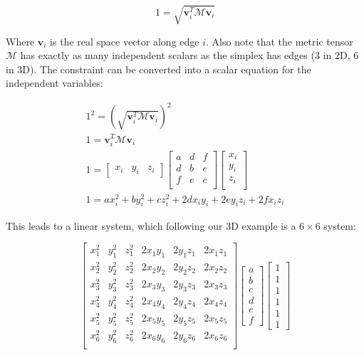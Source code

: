 \begin{equation}
1 = \sqrt{\mathbf{v}_i^T \mathcal{M} \mathbf{v}_i}
\end{equation}

Where $\mathbf{v}_i$ is the real space vector along edge $i$.
Also note that the metric tensor $\mathcal{M}$ has exactly as
many independent scalars as the simplex has edges
($3$ in 2D, $6$ in 3D).
The constraint can be converted into a scalar equation
for the independent variables:

\begin{gather*}
1^2 = \left(\sqrt{\mathbf{v}_i^T \mathcal{M} \mathbf{v}_i}\right)^2 \\
1 = \mathbf{v}_i^T \mathcal{M} \mathbf{v}_i \\
1 = \begin{bmatrix} x_i & y_i & z_i \end{bmatrix}
\begin{bmatrix}
a & d & f \\
d & b & e \\
f & e & c \\
\end{bmatrix}
\begin{bmatrix}
x_i \\
y_i \\
z_i \\
\end{bmatrix} \\
1 = ax_i^2 + by_i^2 + cz_i^2 + 2dx_iy_i + 2ey_iz_i + 2fx_iz_i
\end{gather*}

This leads to a linear system, which following our 3D example
is a $6\times 6$ system:

\begin{equation}
\begin{bmatrix}
x_1^2 & y_1^2 & z_1^2 & 2x_1y_1 & 2y_1z_1 & 2x_1z_1 \\
x_2^2 & y_2^2 & z_2^2 & 2x_2y_2 & 2y_2z_2 & 2x_2z_2 \\
x_3^2 & y_3^2 & z_3^2 & 2x_3y_3 & 2y_3z_3 & 2x_3z_3 \\
x_4^2 & y_4^2 & z_4^2 & 2x_4y_4 & 2y_4z_4 & 2x_4z_4 \\
x_5^2 & y_5^2 & z_5^2 & 2x_5y_5 & 2y_5z_5 & 2x_5z_5 \\
x_6^2 & y_6^2 & z_6^2 & 2x_6y_6 & 2y_6z_6 & 2x_6z_6 \\
\end{bmatrix}
\begin{bmatrix}
a \\ b \\ c \\ d \\ e \\ f
\end{bmatrix}
\begin{bmatrix}
1 \\ 1 \\ 1 \\ 1 \\ 1 \\ 1
\end{bmatrix}
\end{equation}

